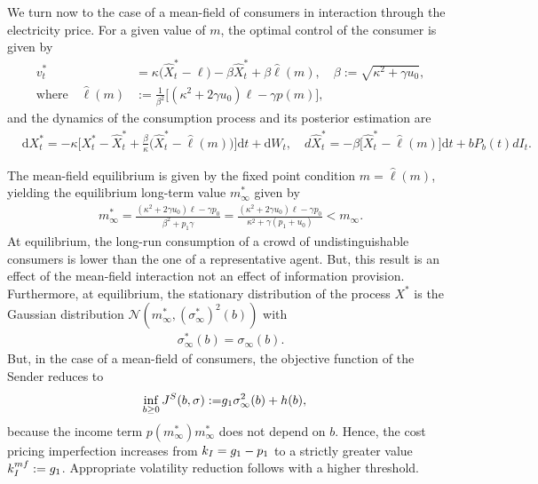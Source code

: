 \documentclass[a4paper,10pt]{article}
\newcommand{\D}{\mathrm{d}}
\theoremstyle{definition}
\theoremstyle{plain}
\numberwithin{equation}{section}
\begin{document}
We turn now to the case of a mean-field of consumers in interaction through the electricity price. For a given value of $m$, the optimal control of the consumer is given by
\begin{align}\label{opt_contr_energy}
v^\ast _t &= \kappa \big(\widehat X_t^\ast  -\ell\big) -\beta \widehat X^\ast_t + 
\beta \hat \ell(m), \quad
\beta:= \sqrt{\kappa^2 + \gamma u_0}, \\
\text{where} \quad \widehat \ell(m) & := \frac{1}{\beta^2}\big[ (\kappa^2 + 2 \gamma u_0)  \ell   -\gamma p(m) \big],
\end{align}
and the dynamics of the consumption process and its posterior estimation are
\begin{align*}
& \D X^\ast_t = -\kappa \Big[ X^*_t -\widehat X^\ast_t + \frac{\beta}{\kappa}\big(\widehat X^\ast_t - \hat \ell(m) \big) \Big] \D t + \D W_t, \quad
 d\widehat X^\ast_t =   -\beta \big[\widehat X^*_t  -  \hat \ell(m)\big] \D t +  b P_{ b }(t) dI_t.
\end{align*}

The mean-field equilibrium is given by the fixed point condition $m = \hat \ell(m)$, yielding the equilibrium long-term value $m^\ast_\infty$ given by
\begin{align}
m^\ast_{\infty} = 
\frac{(\kappa^2  + 2\gamma u_0)  \ell - \gamma p_0}{\beta^2 + p_1\gamma} = 
\frac{(\kappa^2  + 2\gamma u_0)  \ell - \gamma p_0}{\kappa^2 + \gamma(p_1+u_0)} < m_\infty.
\end{align}
At equilibrium, the long-run consumption of a  crowd of undistinguishable consumers is lower than the one of a representative agent. But, this result is an effect of the mean-field interaction not an effect of information provision.  Furthermore, at equilibrium, the stationary distribution of the process $X^*$ is the Gaussian distribution $\mathcal{N}(m^\ast_\infty, (\sigma^\ast_\infty)^2(b))$
with
\begin{align}
\sigma^\ast_\infty(b) = \sigma_\infty(b).
\end{align}
But, in the case of a mean-field of consumers, the objective function of the Sender reduces to
\begin{align}\label{eq:JSmfgred}
 \inf_{b\geq 0} J^{\rm S} (b,\sigma) := &     g_1 \sigma_{\infty}^2(b)  + h(b),
\end{align}
because the income term $p(m^\ast_\infty)m^\ast_\infty$ does not depend on $b$. Hence, the cost pricing imperfection increases from $k_{\rm I} = g_1 - p_1$ to a strictly greater value $k_{\rm I}^{\rm mf} := g_1$. Appropriate volatility reduction follows with a higher threshold.
\end{document}
